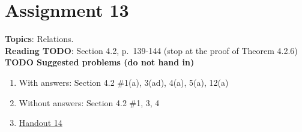 \documentclass[12pt]{article}
\begin{document}



\newpage
\section[13 (due \csname dateWeek13\endcsname): Binary Operations and Bijections/Countability]{Assignment 13}

\textbf{Topics}: Relations.
\\

\noindent \textbf{Reading TODO}: Section 4.2, p.~139-144 (stop at the proof of Theorem 4.2.6)
\\



\noindent \textbf{TODO Suggested problems (do not hand in)}

\begin{enumerate}
\item With answers: Section 4.2 \#1(a), 3(ad), 4(a), 5(a), 12(a)
\item Without answers: Section 4.2 \#1, 3, 4
\item \href{https://www.math.emory.edu/~dzb/teaching/250Fall2021/handouts/250-H14-equivalence-relations.pdf}{Handout 14}
\end{enumerate}
\end{document}
